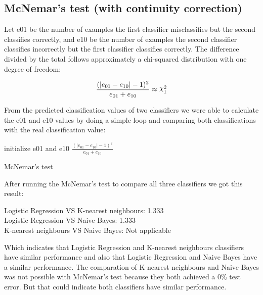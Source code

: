 \documentclass[a4paper]{article}
\DeclareRobustCommand{\rchi}{{\mathpalette\irchi\relax}}
\newcommand{\irchi}[2]{\raisebox{\depth}{$#1\chi$}}
\begin{document}
\subsection{McNemar's test (with continuity correction)}
Let e01 be the number of examples the first classifier
misclassifies but the second classifies correctly, and e10 be the number of examples the second classifier
classifies incorrectly but the first classifier classifies correctly. The difference divided by the total
follows approximately a chi-squared distribution with one degree of freedom:

\begin{equation}
\frac{(|e_{01} - e_{10}| - 1)^2}{e_{01}+e_{10}}\approx\rchi^2_{1}
\end{equation}

From the predicted classification values of two classifiers we were able to calculate the e01 and e10 values by 
doing a simple loop and comparing both classifications with the real classification value:\\

\begin{algorithm}[H]
	initialize e01 and e10\;
	\Return $\frac{(|e_{01} - e_{10}| - 1)^2}{e_{01}+e_{10}}$
	\caption{McNemar's test}
\end{algorithm}
\bigbreak

After running the McNemar's test to compare all three classifiers we got this result:\\
\begin{center}
Logistic Regression VS K-nearest neighbours: 1.333\\
Logistic Regression VS Naive Bayes: 1.333\\
K-nearest neighbours VS Naive Bayes: Not applicable
\end{center}

Which indicates that Logistic Regression and K-nearest neighbours classifiers have similar performance and
also that Logistic Regression and Naive Bayes have a similar performance.
The comparation of K-nearest neighbours and Naive Bayes was not possible with McNemar's test because
they both achieved a 0\% test error. But that could indicate both classifiers have similar performance.
\end{document}
